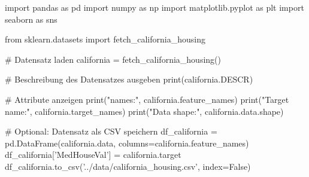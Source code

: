 import pandas as pd
import numpy as np
import matplotlib.pyplot as plt
import seaborn as sns

from sklearn.datasets import fetch_california_housing

# Datensatz laden
california = fetch_california_housing()

# Beschreibung des Datensatzes ausgeben
print(california.DESCR)

# Attribute anzeigen
print("\nFeature names:", california.feature_names)
print("Target name:", california.target_names)
print("Data shape:", california.data.shape)

# Optional: Datensatz als CSV speichern
df_california = pd.DataFrame(california.data, columns=california.feature_names)
df_california['MedHouseVal'] = california.target
df_california.to_csv('../data/california_housing.csv', index=False)